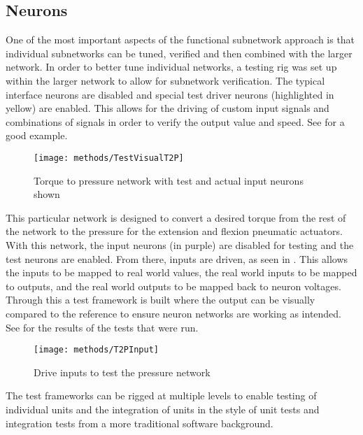 \subsection{Neurons}

One of the most important aspects of the functional subnetwork approach is that
individual subnetworks can be tuned, verified and then combined with the larger
network. In order to better tune individual networks, a testing rig was set up
within the larger network to allow for subnetwork verification. The typical
interface neurons are disabled and special test driver neurons (highlighted in
yellow) are enabled. This allows for the driving of custom input signals and
combinations of signals in order to verify the output value and speed. 
See  for a good example.

\begin{figure}
\centering
\texttt{[image: methods/TestVisualT2P]}
\caption{Torque to pressure network with test and actual input neurons shown}
\label{fig:TestNetworkT2P}
\end{figure}

This particular network is designed to convert a desired torque from the rest
of the network to the pressure for the extension and flexion pneumatic actuators.
With this network, the input neurons (in purple)
are disabled for testing and the test neurons are enabled. From there, inputs
are driven, as seen in . This allows the inputs to 
be mapped to real world values, the real world inputs to be mapped to outputs, 
and the real world outputs to be mapped back to neuron voltages. Through this
a test framework is built where the output can be visually compared to the 
reference to ensure neuron networks are working as intended. See 
 for the results of the tests that were run.

\begin{figure}
\centering
\texttt{[image: methods/T2PInput]}
\caption{Drive inputs to test the pressure network}
\label{fig:TestNetworkInputs}
\end{figure}

The test frameworks can be rigged at multiple levels to enable testing of
individual units and the integration of units in the style of unit tests and
integration tests from a more traditional software background.
